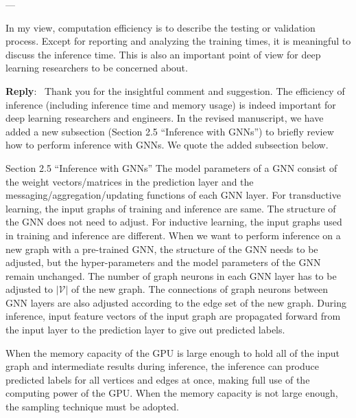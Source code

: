 \documentclass[12pt]{article}
\newenvironment{myquote}[1]%
{\vspace{0.5em}\begin{zitat}{#1}}
{\end{zitat}\vspace{0.5em}}
\newcounter{reviewer}
\newcounter{point}[reviewer]
\renewcommand{\thepoint}{P\,\thereviewer.\arabic{point}}
\newenvironment{point}
   {\refstepcounter{point} \bigskip \noindent {\textbf{Reviewer~Point~\thepoint} } ---\ \begin{sf}}
   {\end{sf} \par}
\newenvironment{reply}
   {\medskip \noindent \textbf{Reply}:\  }
   {\medskip}
\begin{document}
\begin{point}
    In my view, computation efficiency is to describe the testing or validation process. Except for reporting and analyzing the training times, it is meaningful to discuss the inference time. This is also an important point of view for deep learning researchers to be concerned about.
\end{point}

\begin{reply}
    Thank you for the insightful comment and suggestion.
    The efficiency of inference (including inference time and memory usage) is indeed important for deep learning researchers and engineers.
    In the revised manuscript, we have added a new subsection (Section 2.5 ``Inference with GNNs'') to briefly review how to perform inference with GNNs.
    We quote the added subsection below.
    
    \begin{myquote}{Section 2.5 ``Inference with GNNs''}
    The model parameters of a GNN consist of the weight vectors/matrices in the prediction layer and the messaging/aggregation/updating functions of each GNN layer.
    For transductive learning, the input graphs of training and inference are same.
    The structure of the GNN does not need to adjust. 
    For inductive learning, the input graphs used in training and inference are different.
    When we want to perform inference on a new graph with a pre-trained GNN, the structure of the GNN needs to be adjusted, but the hyper-parameters and the model parameters of the GNN remain unchanged.
    The number of graph neurons in each GNN layer has to be adjusted to $|\mathcal{V}|$ of the new graph.
    The connections of graph neurons between GNN layers are also adjusted according to the edge set of the new graph.
    During inference, input feature vectors of the input graph are propagated forward from the input layer to the prediction layer to give out predicted labels.
    
    When the memory capacity of the GPU is large enough to hold all of the input graph and intermediate results during inference, the inference can produce predicted labels for all vertices and edges at once, making full use of the computing power of the GPU.
    When the memory capacity is not large enough, the sampling technique must be adopted.
    

\end{myquote}
\end{reply}
\end{document}
